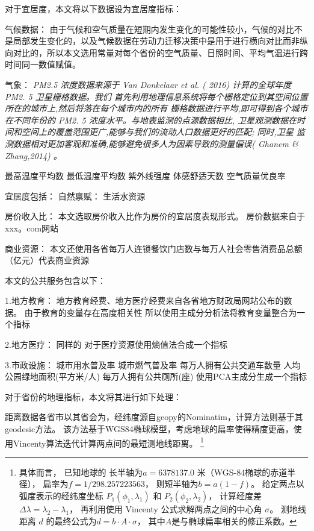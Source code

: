 \documentclass[a4paper, zihao=-4, fontset = mac, oneside]{ctexbook} %
\let\oldfootnote\footnote
\renewcommand{\footnote}[1]{%
  \oldfootnote{\setstretch{1.5}#1}%
}
\begin{document}
对于宜居度，本文将以下数据设为宜居度指标：

气候数据：
由于气候和空气质量在短期内发生变化的可能性较小，气候的对比不是局部发生变化的，以及气候数据在劳动力迁移决策中是用于进行横向对比而非纵向对比的，所以本文选用常量对每个省份的空气质量、日照时间、平均气温进行跨时间同一数值赋值。

气象：
\textit{PM2.5 浓度数据来源于 Van Donkelaar et al. ( 2016) 计算的全球年度 PM2. 5 卫星栅格数据。我们 首先利用地理信息系统将每个栅格定位到其空间位置所在的城市上,然后将落在每个城市内的所有 栅格数据进行平均,即可得到各个城市在不同年份的 PM2. 5 浓度水平。与地表监测的点源数据相比, 卫星观测数据在时间和空间上的覆盖范围更广,能够与我们的流动人口数据更好的匹配; 同时,卫星 监测数据相对更加客观和准确,能够避免很多人为因素导致的测量偏误( Ghanem \& Zhang,2014) 。}

最高温度平均数 最低温度平均数 紫外线强度 体感舒适天数  空气质量优良率



宜居度包括：
自然禀赋：
生活水资源


房价收入比：
本文选取房价收入比作为房价的宜居度表现形式。
房价数据来自于xxx。com网站

商业资源：
本文还使用各省每万人连锁餐饮门店数与每万人社会零售消费品总额（亿元）代表商业资源


本文的公共服务包含以下：

1.地方教育：
地方教育经费、地方医疗经费来自各省地方财政局网站公布的数据。
由于教育的变量存在高度相关性
所以使用主成分分析法将教育变量整合为一个指标

2.地方医疗：
同样的
对于医疗资源使用熵值法合成一个指标

3.市政设施：
城市用水普及率
城市燃气普及率
每万人拥有公共交通车数量
人均公园绿地面积(平方米/人)
每万人拥有公共厕所(座)
使用PCA主成分生成一个指标


对于省份的地理指标，本文将其进行如下处理：

距离数据各省市以其省会为，经纬度源自geopy的Nominatim，计算方法则基于其geodesic方法。
该方法基于WGS84椭球模型，考虑地球的扁率使得精度更高，使用Vincenty算法迭代计算两点间的最短测地线距离。
\footnote{
具体而言，
已知地球的
长半轴为$a = 6378137.0$ 米（WGS-84椭球的赤道半径），
扁率为$f = 1 / 298.257223563$，
则短半轴为$b = a(1 - f)$。
给定两点以弧度表示的经纬度坐标 $ P_1(\phi_1, \lambda_1) $ 和 $ P_2(\phi_2, \lambda_2) $，
计算经度差$\Delta\lambda = \lambda_2 - \lambda_1$，
再利用使用 Vincenty 公式求解两点之间的中心角 $\sigma$。
测地线距离 $d$ 的最终公式为$d = b \cdot A \cdot \sigma$，
其中$A$是与椭球扁率相关的修正系数。
}
\end{document}
